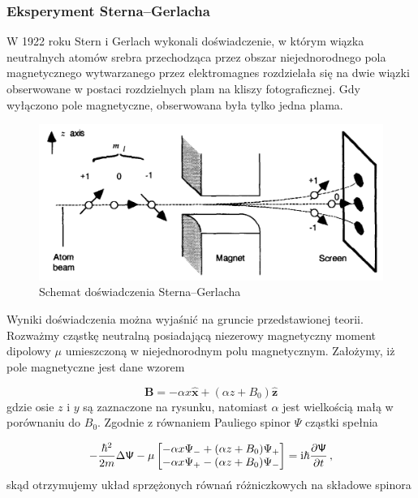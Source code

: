 \documentclass{myclass}
\begin{document}
\subsubsection{Eksperyment Sterna--Gerlacha}

W 1922 roku Stern i Gerlach wykonali doświadczenie, w którym wiązka neutralnych atomów srebra
przechodząca przez obszar niejednorodnego pola magnetycznego wytwarzanego przez elektromagnes
rozdzielała się na dwie wiązki obserwowane w postaci rozdzielnych plam na kliszy fotograficznej. Gdy
wyłączono pole magnetyczne, obserwowana była tylko jedna plama.

\begin{figure}[ht]
    \centering
    \includegraphics[scale=0.25]{figs/stern-gerlach.png}
    \caption{Schemat doświadczenia Sterna--Gerlacha}
    \label{fig:stern-gerlach}
\end{figure}

Wyniki doświadczenia można wyjaśnić na gruncie przedstawionej teorii. Rozważmy cząstkę neutralną
posiadającą niezerowy magnetyczny moment dipolowy \(\mu\) umieszczoną w niejednorodnym polu
magnetycznym. Założymy, iż pole magnetyczne jest dane wzorem

\begin{equation*}
\mathbf{B}=-\alpha x\mathbf{\hat{x}}+(\alpha z+B_0)\mathbf{\hat{z}}
\end{equation*}
gdzie osie \(z\) i \(y\) są zaznaczone na rysunku, natomiast \(\alpha\) jest wielkością małą w
porównaniu do \(B_0\). Zgodnie z równaniem Pauliego spinor \(\mathsf{\Psi}\) cząstki spełnia

\begin{equation*}
-\frac{\hbar^2}{2m}\Delta\mathsf{\Psi}-\mu\begin{bmatrix}
-\alpha x\Psi_-+(\alpha z+B_0)\Psi_+\\
-\alpha x\Psi_+-(\alpha z+B_0)\Psi_-
\end{bmatrix}=\mathrm{i}\hbar\pdv{\mathsf{\Psi}}{t}\,,
\end{equation*}
skąd otrzymujemy układ sprzężonych równań różniczkowych na składowe spinora
\end{document}
